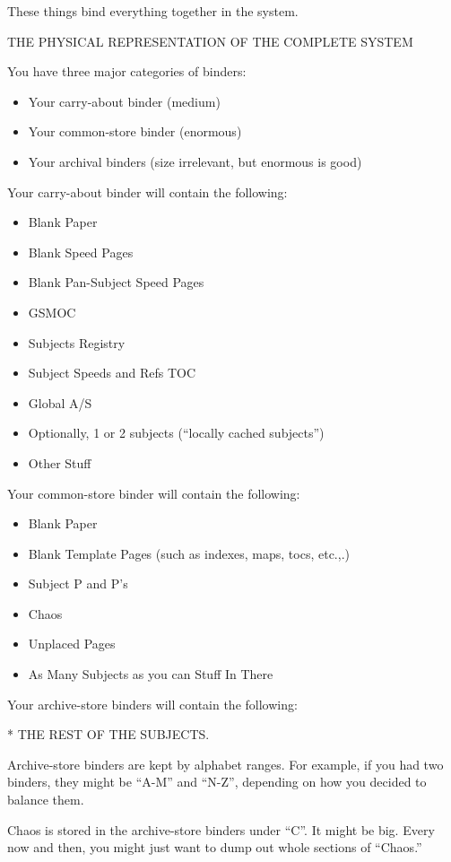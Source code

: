\documentclass[oneside]{book}
\begin{document}
These things bind everything together in the system.

THE PHYSICAL REPRESENTATION OF THE COMPLETE SYSTEM

You have three major categories of binders:

\begin{itemize}
\item Your carry-about binder (medium)
\item Your common-store binder (enormous)
\item Your archival binders (size irrelevant, but enormous is good)
\end{itemize}

Your carry-about binder will contain the following:

\begin{itemize}
\item Blank Paper
\item Blank Speed Pages
\item Blank Pan-Subject Speed Pages
\item GSMOC
\item Subjects Registry
\item Subject Speeds and Refs TOC
\item Global A/S
\item Optionally, 1 or 2 subjects (``locally cached subjects'')
\item Other Stuff
\end{itemize}

Your common-store binder will contain the following:

\begin{itemize}
\item Blank Paper
\item Blank Template Pages (such as indexes, maps, tocs, etc.,.)
\item Subject P and P's
\item Chaos
\item Unplaced Pages
\item As Many Subjects as you can Stuff In There
\end{itemize}

Your archive-store binders will contain the following:

* THE REST OF THE SUBJECTS.

Archive-store binders are kept by alphabet ranges.  For example, if
you had two binders, they might be ``A-M'' and ``N-Z'', depending on how
you decided to balance them.

Chaos is stored in the archive-store binders under ``C''. It might be
big. Every now and then, you might just want to dump out whole
sections of ``Chaos.''
\end{document}
